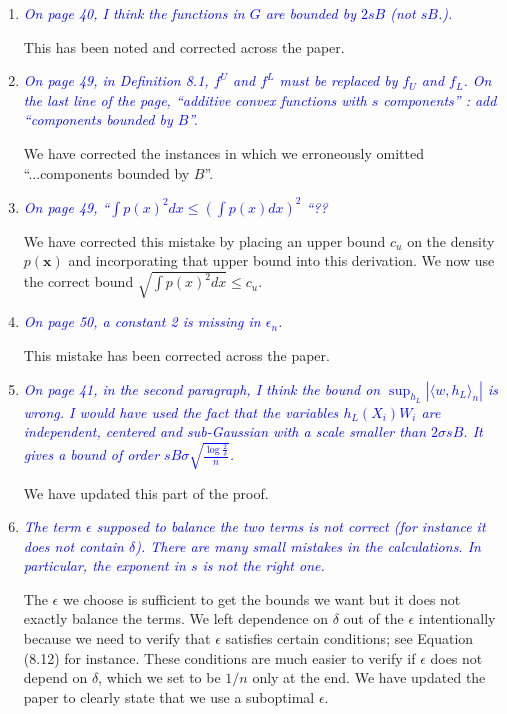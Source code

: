 \documentclass[pdftex,12pt]{article}
\def\rc#1{{\it\textcolor{blue}{#1}}\smallskip}
\begin{document}
\begin{enumerate}
\item \rc{On page 40, I think the functions in $G$ are bounded by $2sB$ (not $sB$.).}

This has been noted and corrected across the paper.

\item \rc{On page 49, in Definition 8.1, $f^U$ and $f^L$ must be replaced by $f_U$ and
$f_L$. On the last line of the page, ``additive convex functions with $s$
components'' : add ``components bounded by $B$''.}

We have corrected the instances in which we erroneously omitted ``...components bounded by $B$''.

\item \rc{On page 49, ``$\int p(x)^2dx \leq (\int p(x)dx)^2$ ``??}

We have corrected this mistake by placing an upper bound $c_u$ on the density $p(\mathbf{x})$ and incorporating that upper bound into this derivation. We now use the correct bound $\sqrt{ \int p(x)^2 dx } \leq c_u$.

\item \rc{On page 50, a constant 2 is missing in $\epsilon_n$.}

This mistake has been corrected across the paper.

\item \rc{On page 41, in the second paragraph, I think the bound on $\sup_{h_L} |⟨w,h_L⟩_n|$ is
wrong. I would have used the fact that the variables $h_L(X_i) W_i$ are
independent, centered and sub-Gaussian with a scale smaller than
$2\sigma s B$. It gives a bound of order $sB\sigma \sqrt{\frac{\log\frac{2}{\delta}}{n}}$.}

We have updated this part of the proof.

\item \rc{The term $\epsilon$ supposed to balance the two terms is not correct (for
instance it does not contain $\delta$). There are many small mistakes in the
calculations. In particular, the exponent in $s$ is not the right one.}

The $\epsilon$ we choose is sufficient to get the bounds we want but
it does not exactly balance the terms. We left dependence on $\delta$
out of the $\epsilon$ intentionally because we need to verify that
$\epsilon$ satisfies certain conditions; see Equation (8.12) for
instance. These conditions are much easier to verify if $\epsilon$
does not depend on $\delta$, which we set to be $1/n$ only at the
end. We have updated the paper to clearly state that we use a
suboptimal $\epsilon$.


\end{enumerate}
\end{document}
